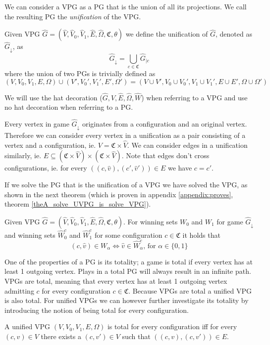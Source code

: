 We can consider a VPG as a PG that is the union of all its projections. We call the resulting PG the \textit{unification} of the VPG.
\begin{definition}
Given VPG $\hat{G} = (\hat{V},\hat{V}_0,\hat{V}_1, \hat{E},\hat{\Omega}, \mathfrak{C},\theta)$ we define the unification of $\hat{G}$, denoted as $\hat{G}_{\downarrow}$, as
\[  \hat{G}_{\downarrow} = \bigcup_{c\in \mathfrak{C}}\hat{G}_{|c} \]
where the union of two PGs is trivially defined as
\[ (V,V_0,V_1,E,\Omega) \cup (V',V_0',V_1',E',\Omega') = (V \cup V', V_0 \cup V_0', V_1 \cup V_1', E \cup E', \Omega \cup \Omega') \]
\end{definition}
We will use the hat decoration ($\hat{G},\hat{V},\hat{E},\hat{\Omega},\hat{W}$) when referring to a VPG and use no hat decoration when referring to a PG.

Every vertex in game $\hat{G}_{\downarrow}$ originates from a configuration and an original vertex. Therefore we can consider every vertex in a unification as a pair consisting of a vertex and a configuration, ie. $V = \mathfrak{C} \times \hat{V}$. We can consider edges in a unification similarly, ie. $E \subseteq (\mathfrak{C} \times \hat{V}) \times (\mathfrak{C} \times \hat{V})$. Note that edges don't cross configurations, ie. for every $((c,\hat{v}) , (c',\hat{v}')) \in E$ we have $c = c'$.

If we solve the PG that is the unification of a VPG we have solved the VPG, as shown in the next theorem (which is proven in appendix \ref{appendix:proves}, theorem \ref{theA_solve_UVPG_is_solve_VPG}).
\begin{theorem}
	Given VPG $\hat{G} =  (\hat{V},\hat{V}_0,\hat{V}_1, \hat{E},\hat{\Omega}, \mathfrak{C},\theta)$. For winning sets $W_0$ and $W_1$ for game $\hat{G}_{\downarrow}$ and winning sets $\hat{W}^c_0$ and $\hat{W}^c_1$ for some configuration $c \in \mathfrak{C}$ it holds that
	\[(c,\hat{v}) \in W_\alpha \iff \hat{v} \in \hat{W}^c_\alpha  \text{, for }\alpha \in \{0,1\}  \]
\end{theorem}

One of the properties of a PG is its totality; a game is total if every vertex has at least 1 outgoing vertex. Plays in a total PG will always result in an infinite path. VPGs are total, meaning that every vertex has at least 1 outgoing vertex admitting $c$ for every configuration $c \in \mathfrak{C}$. Because VPGs are total a unified VPG is also total. For unified VPGs we can however further investigate its totality by introducing the notion of being total for every configuration. 
\begin{definition}
	A unified VPG $(V,V_0,V_1,E,\Omega)$ is total for every configuration iff for every $(c,v) \in V$ there exists a $(c,v') \in V$ such that $((c,v),(c,v')) \in E$.
\end{definition}

